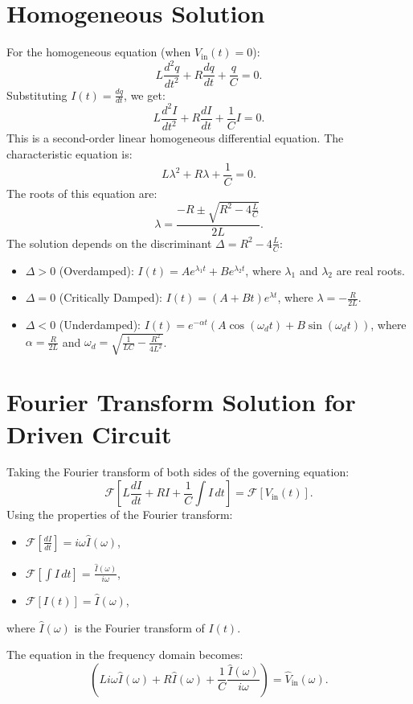 \documentclass[a4paper,11pt]{article}
\begin{document}
\section*{Homogeneous Solution}
For the homogeneous equation (when \(V_{\text{in}}(t) = 0\)):
\[
L \frac{d^2q}{dt^2} + R \frac{dq}{dt} + \frac{q}{C} = 0.
\]
Substituting \(I(t) = \frac{dq}{dt}\), we get:
\[
L \frac{d^2I}{dt^2} + R \frac{dI}{dt} + \frac{1}{C} I = 0.
\]
This is a second-order linear homogeneous differential equation. The characteristic equation is:
\[
L\lambda^2 + R\lambda + \frac{1}{C} = 0.
\]
The roots of this equation are:
\[
\lambda = \frac{-R \pm \sqrt{R^2 - 4\frac{L}{C}}}{2L}.
\]
The solution depends on the discriminant \(\Delta = R^2 - 4\frac{L}{C}\):
\begin{itemize}
    \item \(\Delta > 0\) (Overdamped): \(I(t) = A e^{\lambda_1 t} + B e^{\lambda_2 t}\), where \(\lambda_1\) and \(\lambda_2\) are real roots.
    \item \(\Delta = 0\) (Critically Damped): \(I(t) = (A + Bt)e^{\lambda t}\), where \(\lambda = -\frac{R}{2L}\).
    \item \(\Delta < 0\) (Underdamped): \(I(t) = e^{-\alpha t}(A \cos(\omega_d t) + B \sin(\omega_d t))\), where \(\alpha = \frac{R}{2L}\) and \(\omega_d = \sqrt{\frac{1}{LC} - \frac{R^2}{4L^2}}\).
\end{itemize}

\section*{Fourier Transform Solution for Driven Circuit}
Taking the Fourier transform of both sides of the governing equation:
\[
\mathcal{F}\left[L \frac{dI}{dt} + R I + \frac{1}{C} \int I \, dt \right] = \mathcal{F}\left[V_{\text{in}}(t)\right].
\]
Using the properties of the Fourier transform:
\begin{itemize}
    \item \(\mathcal{F}\left[\frac{dI}{dt}\right] = i\omega \hat{I}(\omega)\),
    \item \(\mathcal{F}\left[\int I \, dt\right] = \frac{\hat{I}(\omega)}{i\omega}\),
    \item \(\mathcal{F}\left[I(t)\right] = \hat{I}(\omega)\),
\end{itemize}
where \(\hat{I}(\omega)\) is the Fourier transform of \(I(t)\).

The equation in the frequency domain becomes:
\[
\left(L i\omega \hat{I}(\omega) + R \hat{I}(\omega) + \frac{1}{C} \frac{\hat{I}(\omega)}{i\omega}\right) = \hat{V}_{\text{in}}(\omega).
\]
\end{document}
